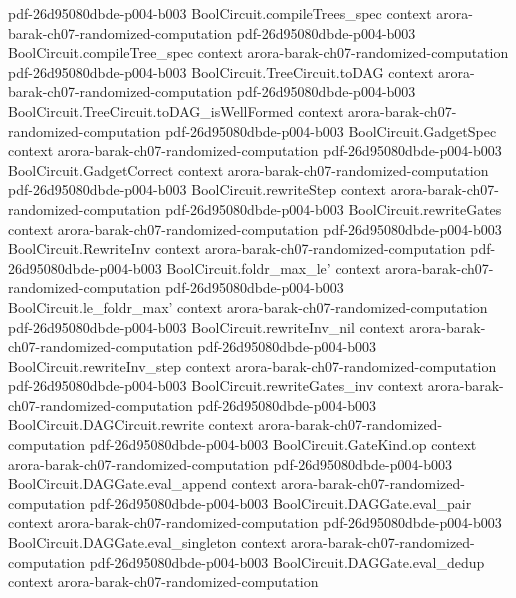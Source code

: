 \begin{theorem}
  {pdf-26d95080dbde-p004-b003}
\proofstep
  {BoolCircuit.compileTrees_spec}
  {context}
  {arora-barak-ch07-randomized-computation}
  {pdf-26d95080dbde-p004-b003}
\proofstep
  {BoolCircuit.compileTree_spec}
  {context}
  {arora-barak-ch07-randomized-computation}
  {pdf-26d95080dbde-p004-b003}
\proofstep
  {BoolCircuit.TreeCircuit.toDAG}
  {context}
  {arora-barak-ch07-randomized-computation}
  {pdf-26d95080dbde-p004-b003}
\proofstep
  {BoolCircuit.TreeCircuit.toDAG_isWellFormed}
  {context}
  {arora-barak-ch07-randomized-computation}
  {pdf-26d95080dbde-p004-b003}
\proofstep
  {BoolCircuit.GadgetSpec}
  {context}
  {arora-barak-ch07-randomized-computation}
  {pdf-26d95080dbde-p004-b003}
\proofstep
  {BoolCircuit.GadgetCorrect}
  {context}
  {arora-barak-ch07-randomized-computation}
  {pdf-26d95080dbde-p004-b003}
\proofstep
  {BoolCircuit.rewriteStep}
  {context}
  {arora-barak-ch07-randomized-computation}
  {pdf-26d95080dbde-p004-b003}
\proofstep
  {BoolCircuit.rewriteGates}
  {context}
  {arora-barak-ch07-randomized-computation}
  {pdf-26d95080dbde-p004-b003}
\proofstep
  {BoolCircuit.RewriteInv}
  {context}
  {arora-barak-ch07-randomized-computation}
  {pdf-26d95080dbde-p004-b003}
\proofstep
  {BoolCircuit.foldr_max_le'}
  {context}
  {arora-barak-ch07-randomized-computation}
  {pdf-26d95080dbde-p004-b003}
\proofstep
  {BoolCircuit.le_foldr_max'}
  {context}
  {arora-barak-ch07-randomized-computation}
  {pdf-26d95080dbde-p004-b003}
\proofstep
  {BoolCircuit.rewriteInv_nil}
  {context}
  {arora-barak-ch07-randomized-computation}
  {pdf-26d95080dbde-p004-b003}
\proofstep
  {BoolCircuit.rewriteInv_step}
  {context}
  {arora-barak-ch07-randomized-computation}
  {pdf-26d95080dbde-p004-b003}
\proofstep
  {BoolCircuit.rewriteGates_inv}
  {context}
  {arora-barak-ch07-randomized-computation}
  {pdf-26d95080dbde-p004-b003}
\proofstep
  {BoolCircuit.DAGCircuit.rewrite}
  {context}
  {arora-barak-ch07-randomized-computation}
  {pdf-26d95080dbde-p004-b003}
\proofstep
  {BoolCircuit.GateKind.op}
  {context}
  {arora-barak-ch07-randomized-computation}
  {pdf-26d95080dbde-p004-b003}
\proofstep
  {BoolCircuit.DAGGate.eval_append}
  {context}
  {arora-barak-ch07-randomized-computation}
  {pdf-26d95080dbde-p004-b003}
\proofstep
  {BoolCircuit.DAGGate.eval_pair}
  {context}
  {arora-barak-ch07-randomized-computation}
  {pdf-26d95080dbde-p004-b003}
\proofstep
  {BoolCircuit.DAGGate.eval_singleton}
  {context}
  {arora-barak-ch07-randomized-computation}
  {pdf-26d95080dbde-p004-b003}
\proofstep
  {BoolCircuit.DAGGate.eval_dedup}
  {context}
  {arora-barak-ch07-randomized-computation}

\end{theorem}
